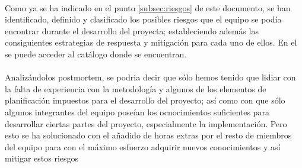 \paragraph{}Como ya se ha indicado en el punto \ref{subsec:riesgos} de este documento, se han identificado, definido y clasificado los posibles riesgos que el equipo se podía encontrar durante el desarrollo del proyecta; estableciendo además las consiguientes estrategias de respuesta y mitigación para cada uno de ellos.
En el  se puede acceder al catálogo donde se encuentran.

\paragraph{}Analizándolos postmortem, se podria decir que sólo hemos tenido que lidiar con la falta de experiencia con la metodología y algunos de los elementos de planificación impuestos para el desarrollo del proyecto; así como con que sólo algunos integrantes del equipo poseían los ocnocimientos suficientes para desarrollar ciertas partes del proyecto, especialmente la implementación. Pero esto se ha solucionado con el añadido de horas extras por el resto de miembros del equipo para con el máximo esfuerzo adquirir nuevos conocimientos y así mitigar estos riesgos